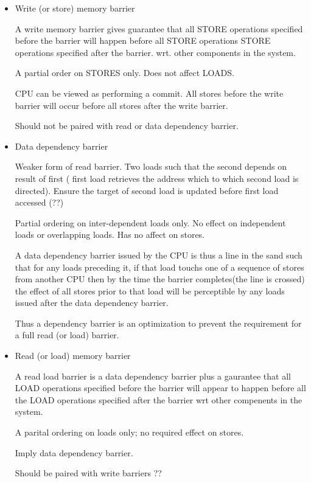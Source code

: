 \documentclass{article}
\begin{document}
\begin{itemize}
\item Write (or store) memory barrier

  A write memory barrier gives guarantee that all STORE operations
  specified before the barrier will happen before all STORE operations
  STORE operations specified after the barrier. wrt. other components
  in the system.

  A partial order on STORES only. Does not affect LOADS.

  CPU can be viewed as performing a commit. All stores before the
  write barrier will occur before all stores after the write barrier.

  Should not be paired with read or data dependency barrier.
  
\item Data dependency barrier

  Weaker form of read barrier. Two loads such that the second depends
  on result of first ( first load retrieves the address which to which
  second load is directed). Ensure the target of second load is
  updated before first load accessed (??)

  Partial ordering on inter-dependent loads only. No effect on
  independent loads or overlapping loads. Has no affect on stores.

  A data dependency barrier issued by the CPU is thus a line in the
  sand such that for any loads preceding it, if that load touchs one
  of a sequence of stores from another CPU then by the time the
  barrier completes(the line is crossed) the effect of all stores
  prior to that load will be perceptible by any loads issued after the
  data dependency barrier.

  Thus a dependency barrier is an optimization to prevent the
  requirement for a full read (or load) barrier.


\item Read (or load) memory barrier

  A read load barrier is a data dependency barrier plus a gaurantee
  that all LOAD operations specified before the barrier will appear to
  happen before all the LOAD operations specified after the barrier
  wrt other compenents in the system.

  A parital ordering on loads only; no required effect on stores.

  Imply data dependency barrier.

  Should be paired with write barriers ??


\end{itemize}
\end{document}
